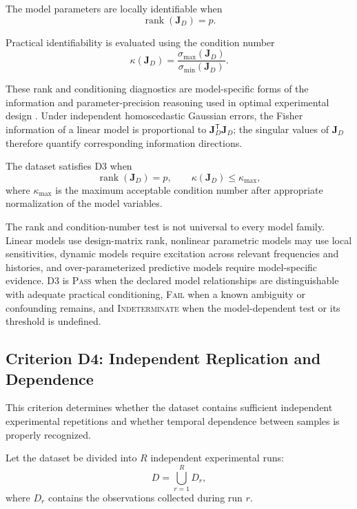 \documentclass[11pt,a4paper]{article}
\begin{document}
The model parameters are locally identifiable when
\begin{equation}
    \operatorname{rank}(\mathbf{J}_D)=p.
\end{equation}

Practical identifiability is evaluated using the condition number
\begin{equation}
    \kappa(\mathbf{J}_D)
    =
    \frac{\sigma_{\max}(\mathbf{J}_D)}
         {\sigma_{\min}(\mathbf{J}_D)}.
\end{equation}

These rank and conditioning diagnostics are model-specific forms of the
information and parameter-precision reasoning used in optimal experimental
design \cite{forbes2013,manchester2010,wilson2014}. Under independent
homoscedastic Gaussian errors, the Fisher information of a linear model is
proportional to $\mathbf{J}_D^{\mathsf{T}}\mathbf{J}_D$; the singular values of
$\mathbf{J}_D$ therefore quantify corresponding information directions.

The dataset satisfies D3 when
\begin{equation}
    \operatorname{rank}(\mathbf{J}_D)=p,
    \qquad
    \kappa(\mathbf{J}_D)\leq\kappa_{\max},
\end{equation}
where $\kappa_{\max}$ is the maximum acceptable condition number after
appropriate normalization of the model variables.

The rank and condition-number test is not universal to every model family.
Linear models use design-matrix rank, nonlinear parametric models may use
local sensitivities, dynamic models require excitation across relevant
frequencies and histories, and over-parameterized predictive models require
model-specific evidence. D3 is \textsc{Pass} when the declared model
relationships are distinguishable with adequate practical conditioning,
\textsc{Fail} when a known ambiguity or confounding remains, and
\textsc{Indeterminate} when the model-dependent test or its threshold is
undefined.

\subsection{Criterion D4: Independent Replication and Dependence}

This criterion determines whether the dataset contains sufficient independent
experimental repetitions and whether temporal dependence between samples is
properly recognized.

Let the dataset be divided into $R$ independent experimental runs:
\begin{equation}
    D
    =
    \bigcup_{r=1}^{R}D_r,
\end{equation}
where $D_r$ contains the observations collected during run $r$.
\end{document}

